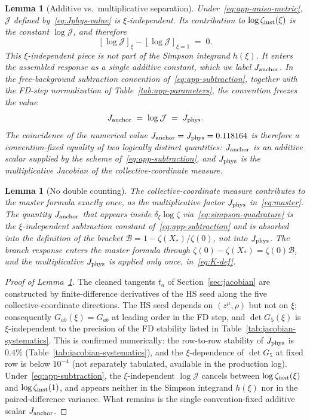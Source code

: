 \documentclass[a4paper,11pt]{article}
\newtheorem{lemma}[theorem]{Lemma}
\theoremstyle{definition}
\newcommand{\Jphys}{J_{\rm phys}}
\newcommand{\Bobs}{\mathcal{B}}
\begin{document}
\begin{lemma}[Additive vs.\ multiplicative separation]
\label{lem:additive-separation}
Under~\eqref{eq:app-aniso-metric}, $\mathcal{J}$ defined by~\eqref{eq:Jphys-value} is $\xi$-independent. Its contribution to $\log\zeta_{\rm inst}(\xi)$ is the constant $\log\mathcal{J}$, and therefore
\[
[\log\mathcal{J}]_{\xi} - [\log\mathcal{J}]_{\xi=1} \;=\; 0.
\]
This $\xi$-independent piece is not part of the Simpson integrand $h(\xi)$. It enters the assembled response as a single additive constant, which we label $J_{\rm anchor}$. In the free-background subtraction convention of~\eqref{eq:app-subtraction}, together with the FD-step normalization of Table~\ref{tab:app-parameters}, the convention freezes the value
\[
J_{\rm anchor} \;=\; \log\mathcal{J} \;=\; \Jphys.
\]
The coincidence of the numerical value $J_{\rm anchor} = \Jphys = 0.118164$ is therefore a convention-fixed equality of two logically distinct quantities: $J_{\rm anchor}$ is an additive scalar supplied by the scheme of~\eqref{eq:app-subtraction}, and $\Jphys$ is the multiplicative Jacobian of the collective-coordinate measure.
\end{lemma}

\begin{lemma}[No double counting]
\label{lem:no-double-counting}
The collective-coordinate measure contributes to the master formula exactly once, as the multiplicative factor $\Jphys$ in~\eqref{eq:master}. The quantity $J_{\rm anchor}$ that appears inside $\delta_\xi\log\zeta$ via~\eqref{eq:simpson-quadrature} is the $\xi$-independent subtraction constant of~\eqref{eq:app-subtraction} and is absorbed into the definition of the bracket $\Bobs = 1 - \zeta(X_*)/\zeta(0)$, not into $\Jphys$. The branch response enters the master formula through $\zeta(0) - \zeta(X_*) = \zeta(0)\Bobs$, and the multiplicative $\Jphys$ is applied only once, in~\eqref{eq:K-def}.
\end{lemma}

\begin{proof}[Proof of Lemma~\ref{lem:additive-separation}]
The cleaned tangents $t_a$ of Section~\ref{sec:jacobian} are constructed by finite-difference derivatives of the HS seed along the five collective-coordinate directions. The HS seed depends on $(z^\mu, \rho)$ but not on $\xi$; consequently $G_{ab}(\xi) = G_{ab}$ at leading order in the FD step, and $\det G_5(\xi)$ is $\xi$-independent to the precision of the FD stability listed in Table~\ref{tab:jacobian-systematics}. This is confirmed numerically: the row-to-row stability of $\Jphys$ is $0.4\%$ (Table~\ref{tab:jacobian-systematics}), and the $\xi$-dependence of $\det G_5$ at fixed row is below $10^{-4}$ (not separately tabulated, available in the production log). Under~\eqref{eq:app-subtraction}, the $\xi$-independent $\log\mathcal{J}$ cancels between $\log\zeta_{\rm inst}(\xi)$ and $\log\zeta_{\rm inst}(1)$, and appears neither in the Simpson integrand $h(\xi)$ nor in the paired-difference variance. What remains is the single convention-fixed additive scalar $J_{\rm anchor}$.
\end{proof}
\end{document}
